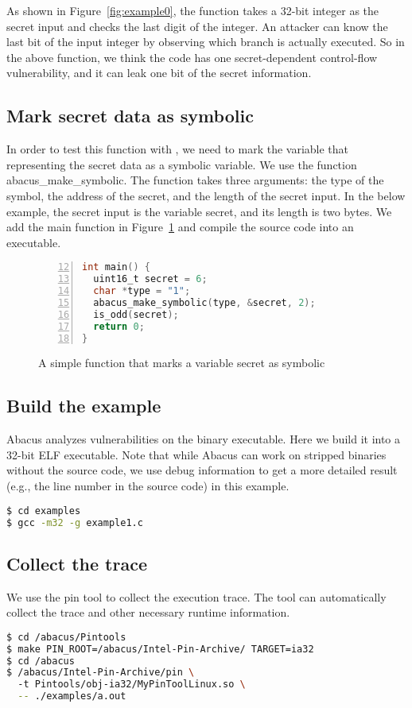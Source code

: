As shown in Figure~\ref{fig:example0}, the function takes a 32-bit integer as the secret input and checks the last digit of the integer. An attacker can know the last bit of the input integer by observing which branch is actually executed. So in the above function, we think the code has one secret-dependent control-flow vulnerability, and it can leak one bit of the secret information.

\subsection*{Mark secret data as symbolic}
In order to test this function with \tool{}, we need to mark the variable that representing the secret data as a symbolic variable. We use the function \textsf{abacus\_make\_symbolic}. The function takes three arguments: the type of the symbol, the address of the secret, and the length of the secret input. In the below example, the secret input is the variable \textsf{secret}, and its length is two bytes. We add the \textsf{main} function in Figure~\ref{fig:example1} and compile the source code into an executable.

\begin{figure}[h]
\begin{lstlisting}[firstnumber=12, xleftmargin=.07\textwidth, xrightmargin=.07\textwidth, numbers=left, frame=single, language=C]
int main() {
  uint16_t secret = 6;
  char *type = "1";
  abacus_make_symbolic(type, &secret, 2); 
  is_odd(secret);
  return 0;
}
\end{lstlisting}
\caption{A simple function that marks a variable \textsf{secret} as symbolic}
\label{fig:example1}
\end{figure}


\subsection*{Build the example}

Abacus analyzes vulnerabilities on the binary executable. Here we build it into  a 32-bit ELF executable. Note that while Abacus can work on stripped binaries without the source code, we use debug information to get a more detailed result (e.g., the line number in the source code) in this example.
\begin{lstlisting}[language=bash]
$ cd examples
$ gcc -m32 -g example1.c
\end{lstlisting}


\subsection*{Collect the trace}
We use the pin tool to collect the execution trace. The tool can automatically collect the trace and other necessary runtime information.
\begin{lstlisting}[language=bash]
$ cd /abacus/Pintools
$ make PIN_ROOT=/abacus/Intel-Pin-Archive/ TARGET=ia32
$ cd /abacus
$ /abacus/Intel-Pin-Archive/pin \ 
  -t Pintools/obj-ia32/MyPinToolLinux.so \
  -- ./examples/a.out 
\end{lstlisting}

